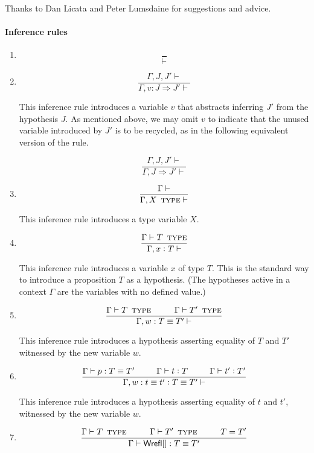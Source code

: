 \documentclass[11pt]{article}
\newcommand{\eqd}{\equiv}
\newcommand\spc{{\hskip 26pt}}
\newcommand{\ccolon}{\vcentcolon}
\newcommand{\TYPE}{\mathop{\text{ \sc type}}}
\newcommand{\Okay}{\mathop{\text{ \sc okay}}}
\newcommand{\Context}{\vdash\Okay}
\renewcommand{\Context}{\vdash}
\newcommand{\ha}[2]{#1[#2]}
\newcommand{\Wrefl}{{\sf Wrefl}}
\begin{document}
Thanks to Dan Licata and Peter Lumsdaine for suggestions and advice.

\paragraph{Inference rules} 

\begin{enumerate}

\item
$$\frac{}{\Context}$$

\item
$$\frac{\Gamma,J,J'\Context}{\Gamma,v : J \Rightarrow J' \Context}$$

This inference rule introduces a variable $v$ that abstracts inferring $J'$ from the hypothesis $J$.
As mentioned above, we may omit $v$ to indicate that the unused variable introduced by $J'$ is to be recycled, as 
in the following equivalent version of the rule.

$$\frac{\Gamma,J,J'\Context}{\Gamma,J \Rightarrow J' \Context}$$

\item
$$\frac{\Gamma\Context}{\Gamma, X \TYPE \Context}$$

This inference rule introduces a type variable $X$.

\item
$$\frac{\Gamma \vdash T \TYPE}{\Gamma, x \ccolon T \Context}$$

This inference rule introduces a variable $x$ of type $T$.  This is the
standard way to introduce a proposition $T$ as a hypothesis.  (The hypotheses
active in a context $\Gamma$ are the variables with no defined value.)

\item
$$\frac{
  \Gamma \vdash T \TYPE  
  \spc
  \Gamma \vdash T' \TYPE }
{\Gamma, w : T \eqd T' \Context}$$

This inference rule introduces a hypothesis asserting equality of $T$ and $T'$ witnessed
by the new variable $w$.

\item
  \[\frac{
  \Gamma \vdash p : T \eqd T'
  \spc
  \Gamma \vdash t \ccolon T
  \spc
  \Gamma \vdash t' \ccolon T'
  } {
  \Gamma, w : t \eqd t' \ccolon T \eqd T' \Context}\]

This inference rule introduces a hypothesis asserting equality of $t$ and $t'$,
witnessed by the new variable $w$.

\item 
\[\frac{\Gamma \vdash T \TYPE \spc \Gamma \vdash T' \TYPE \spc T = T'}
       {\Gamma \vdash \ha\Wrefl{}: T\eqd T'}
\]


\end{enumerate}
\end{document}
